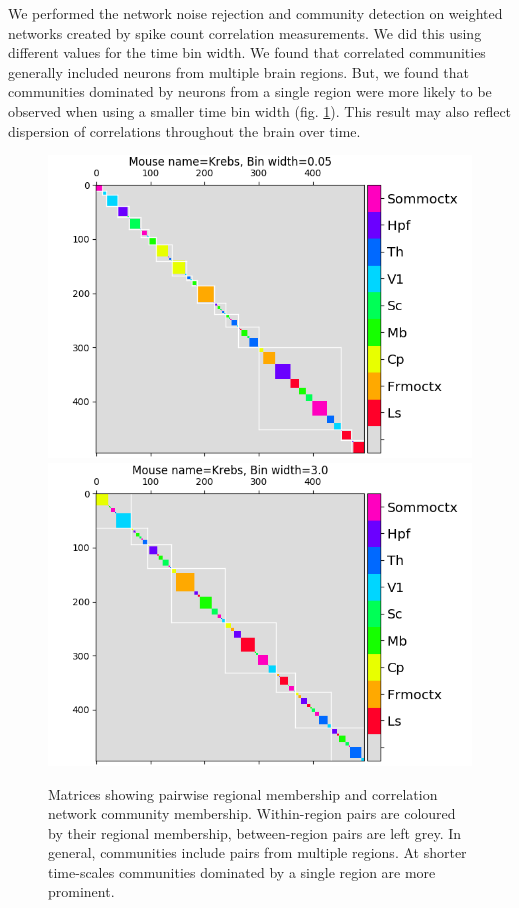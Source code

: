 \documentclass[a4paper,12pt]{article}
\theoremstyle{definition}
\begin{document}
We performed the network noise rejection and community detection on weighted networks created by spike count correlation measurements. We did this using different values for the time bin width. We found that correlated communities generally included neurons from multiple brain regions. But, we found that communities dominated by neurons from a single region were more likely to be observed when using a smaller time bin width (fig. \ref{fig:regional_cluster_maps}). This result may also reflect dispersion of correlations throughout the brain over time.

\begin{figure}[t!]
    \centering
    \includegraphics[width=0.45\columnwidth]{images/Krebs_0p05_regional_cluster_map.png}
    \includegraphics[width=0.45\columnwidth]{images/Krebs_3p0_regional_cluster_map.png}
    \vspace{-0.3cm}
    \caption{Matrices showing pairwise regional membership and correlation network community membership. Within-region pairs are coloured by their regional membership, between-region pairs are left grey. In general, communities include pairs from multiple regions. At shorter time-scales communities dominated by a single region are more prominent.}
    \label{fig:regional_cluster_maps}
\end{figure}


\vspace{-0.5cm}


\end{document}
